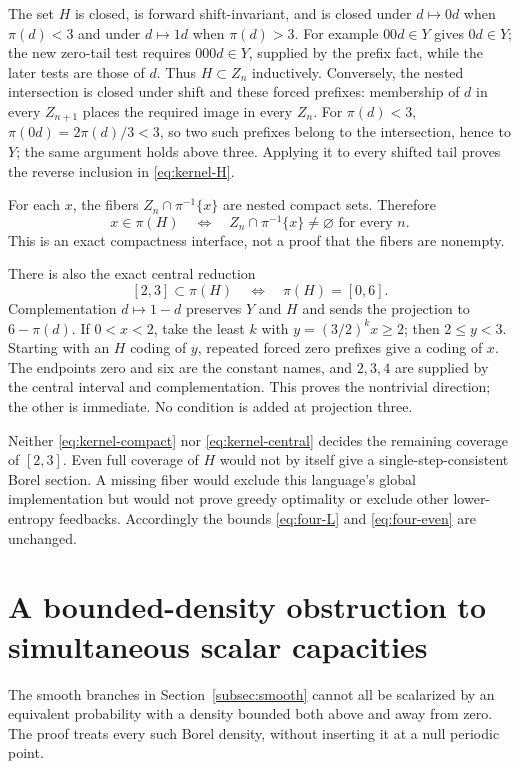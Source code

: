 \documentclass[11pt,reqno]{amsart}
\numberwithin{equation}{section}
\theoremstyle{definition}
\begin{document}
The set $H$ is closed, is forward shift-invariant, and is closed
under $d\mapsto0d$ when $\pi(d)<3$ and under $d\mapsto1d$
when $\pi(d)>3$. For example $00d\in Y$ gives $0d\in Y$;
the new zero-tail test requires $000d\in Y$, supplied by the
prefix fact, while the later tests are those of $d$. Thus
$H\subset Z_n$ inductively. Conversely, the nested intersection
is closed under shift and these forced prefixes: membership of
$d$ in every $Z_{n+1}$ places the required image in every $Z_n$.
For $\pi(d)<3$, $\pi(0d)=2\pi(d)/3<3$, so two such
prefixes belong to the intersection, hence to $Y$; the same
argument holds above three. Applying it to every shifted tail
proves the reverse inclusion in \eqref{eq:kernel-H}.

For each $x$, the fibers $Z_n\cap\pi^{-1}\{x\}$ are nested
compact sets. Therefore
\begin{equation}\label{eq:kernel-compact}
 x\in\pi(H)\quad\Longleftrightarrow\quad
 Z_n\cap\pi^{-1}\{x\}\ne\varnothing\text{ for every }n.
\end{equation}
This is an exact compactness interface, not a proof that the fibers
are nonempty.

There is also the exact central reduction
\begin{equation}\label{eq:kernel-central}
 [2,3]\subset\pi(H)\quad\Longleftrightarrow\quad\pi(H)=[0,6].
\end{equation}
Complementation $d\mapsto1-d$ preserves $Y$ and $H$ and
sends the projection to $6-\pi(d)$. If $0<x<2$, take the
least $k$ with $y=(3/2)^kx\ge2$; then $2\le y<3$.
Starting with an $H$ coding of $y$, repeated forced zero
prefixes give a coding of $x$. The endpoints zero and six are
the constant names, and $2,3,4$ are supplied by the central
interval and complementation. This proves the nontrivial direction;
the other is immediate. No condition is added at projection three.

Neither \eqref{eq:kernel-compact} nor
\eqref{eq:kernel-central} decides the remaining coverage of
$[2,3]$. Even full coverage of $H$ would not by itself give a
single-step-consistent Borel section. A missing fiber would exclude
this language's global implementation but would not prove greedy
optimality or exclude other lower-entropy feedbacks. Accordingly
the bounds \eqref{eq:four-L} and \eqref{eq:four-even} are unchanged.

\section{A bounded-density obstruction to simultaneous scalar capacities}
\label{app:measure}
The smooth branches in Section~\ref{subsec:smooth} cannot all be
scalarized by an equivalent probability with a density bounded both
above and away from zero. The proof treats every such Borel density,
without inserting it at a null periodic point.
\end{document}
